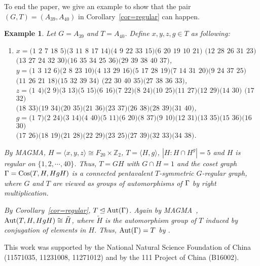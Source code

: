 \documentclass[12pt]{article}
\newtheorem{exam}[lem]{Example}%
\def\f{\noindent}
\def\Aut{\hbox{\rm Aut}}
\def\Cos{\hbox{\rm Cos}}
\def\mz{{\mathbb Z}}
\begin{document}
To end the paper, we give an example to show that the pair $(G,T)=(A_{39},A_{40})$ in Corollary~\ref{cor=regular} can happen.

\begin{exam}\label{NonNormalExample} Let $G=A_{39}$ and $T=A_{40}$. Define $x,y,z,g\in T$ as following:

\begin{enumerate}
\item[]$x=(1$ $2$ $7$ $18$ $5)(3$ $11$ $8$ $17$ $14)(4$ $9$ $22$ $33$ $15)(6$ $20$ $19$ $10$ $21)$ $(12$ $28$ $26$ $31$ $23)$
    \\
   \mbox{}\hskip 0.8cm $(13$ $27$ $24$ $32$ $30)$$(16$ $35$ $34$ $25$ $36)$$(29$ $39$ $38$ $40$ $37)$,\\
$y=(1$ $3$ $12$ $6)$$(2$ $8$ $23$ $10)$$(4$ $13$ $29$ $16)(5$ $17$ $28$ $19)(7$ $14$ $31$ $20)(9$ $24$ $37$ $25)$\\
\mbox{}\hskip 0.8cm $(11$ $26$ $21$ $18)(15$ $32$ $39$ $34)$ $(22$ $30$ $40$ $35)(27$ $38$ $36$ $33)$,\\
$z=(1$ $4)$$(2$ $9)$$(3$ $13)$$(5$ $15)$$(6$ $16)$$(7$ $22)$$(8$ $24)$$(10$ $25)$$(11$ $27)$$(12$ $29)$$(14$ $30)$ $(17$ $32)$\\
\mbox{}\hskip 0.8cm $(18$ $33)$$(19$ $34)$$(20$ $35)$$(21$ $36)$$(23$ $37)$$(26$ $38)$$(28$ $39)$$(31$ $40)$,\\
$g=(1$ $7)$$(2$ $24)$$(3$ $14)$$(4$ $40)$$(5$ $11)$$(6$ $20)$$(8$ $37)$$(9$ $10)$$(12$ $31)$$(13$ $35)$$(15$ $36)$$(16$ $30)$ \\
\mbox{}\hskip 0.8cm $(17$ $26)$$(18$ $19)$$(21$ $28)$$(22$ $29)$$(23$ $25)$$(27$ $39)$$(32$ $33)$$(34$ $38)$.\\
\end{enumerate}

\rm {By MAGMA\cite{magma}, $H=\langle x,y,z\rangle\cong F_{20}\times \mz_2$, $T=\langle H,g\rangle$, $|H:H\cap H^g|=5$ and $H$ is regular on $\{1,2,\cdots, 40\}$. Thus, $T=GH$ with $G\cap H=1$ and the coset graph $\G=\Cos(T,H,HgH)$ is a connected pentavalent $T$-symmetric $G$-regular graph, where $G$ and $T$ are viewed as groups of automorphisms of $\Gamma$ by right multiplication.

By Corollary~\ref{cor=regular}, $T\unlhd \Aut(\G)$. Again by MAGMA~\cite{magma}, $\Aut(T,H,HgH)\cong \tilde{H}$, where $\tilde{H}$ is the automorphism group of $T$ induced by conjugation of elements in $H$. Thus, $\Aut(\G)=T$ by \cite[Lemma 2.10]{Wang}.}
\end{exam}

\medskip
\f {\bf Acknowledgement:} This work was supported by the National Natural Science Foundation of China (11571035, 11231008, 11271012) and by the 111 Project of China (B16002).
\end{document}
